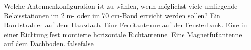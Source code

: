     {Welche Antennenkonfiguration ist zu wählen, wenn möglichst viele umliegende Relaisstationen im 2 m- oder im 70 cm-Band erreicht werden sollen?}
    {Ein Rundstrahler auf dem Hausdach.}
    {Eine Ferritantenne auf der Fensterbank.}
    {Eine in einer Richtung fest montierte horizontale Richtantenne.}
    {Eine Magnetfußantenne auf dem Dachboden.}
    {false}{false}